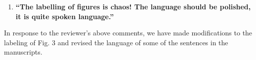 \documentclass[11pt,letterpaper]{report}
\begin{document}
\begin{enumerate}[label=\textit{1.\arabic*},wide, labelwidth=!, labelindent=0pt]
\begin{enumerate}[label=\textit{2.\arabic*},wide, labelindent=0pt]
\newpage
\item \label{r2c2}{\bf ``The labelling of figures is chaos! The language should be polished, it is quite spoken language.''}
\end{enumerate}

In response to the reviewer's above comments, we have made modifications to the labeling of Fig. 3 and revised the language of some of the sentences in the manuscripts.


\end{enumerate}

\clearpage



\end{document}

